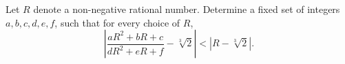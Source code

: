 Let $ R$ denote a non-negative rational number. Determine a fixed set of integers $ a,b,c,d,e,f$,  such that for every choice of $ R$,  \[ \left| \frac{aR^2+bR+c}{dR^2+eR+f}-\sqrt[3]{2}\right| < \left|R-\sqrt[3]{2}\right|.\]